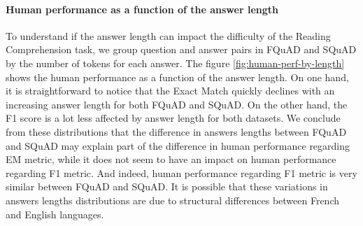 \documentclass{article}
\begin{document}
\paragraph{Human performance as a function of the answer length}{
To understand if the answer length can impact the difficulty of the Reading Comprehension task, we group question and answer pairs in FQuAD and SQuAD by the number of tokens for each answer.
The figure \ref{fig:human-perf-by-length} shows the human performance as a function of the answer length.
On one hand, it is straightforward to notice that the Exact Match quickly declines with an increasing answer length for both FQuAD and SQuAD.
On the other hand, the F1 score is a lot less affected by answer length for both datasets.
We conclude from these distributions that the difference in answers lengths between FQuAD and SQuAD may explain part of the difference in human performance regarding EM metric, while it does not seem to have an impact on human performance regarding F1 metric.
And indeed, human performance regarding F1 metric is very similar between FQuAD and SQuAD.
It is possible that these variations in answers lengths distributions are due to structural differences between French and English languages.
}

\end{document}
